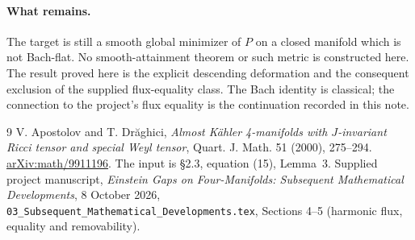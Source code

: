 \documentclass[11pt]{article}
\theoremstyle{remark}
\begin{document}
\paragraph{What remains.}
The target is still a smooth global minimizer of $P$ on a closed manifold
which is not Bach-flat. No smooth-attainment theorem or such metric is
constructed here. The result proved here is the explicit descending
deformation and the consequent exclusion of the supplied flux-equality
class. The Bach identity is classical; the connection to the project's
flux equality is the continuation recorded in this note.

\begin{thebibliography}{9}
V. Apostolov and T. Dr\u aghici,
\emph{Almost K\"ahler 4-manifolds with $J$-invariant Ricci tensor and
special Weyl tensor}, Quart. J. Math. 51 (2000), 275--294.
\href{https://arxiv.org/abs/math/9911196}{arXiv:math/9911196}.
The input is \S2.3, equation (15), Lemma~3.
Supplied project manuscript, \emph{Einstein Gaps on Four-Manifolds:
Subsequent Mathematical Developments}, 8 October 2026,
\texttt{03\_Subsequent\_Mathematical\_Developments.tex},
Sections 4--5 (harmonic flux, equality and removability).
\end{thebibliography}
\end{document}
